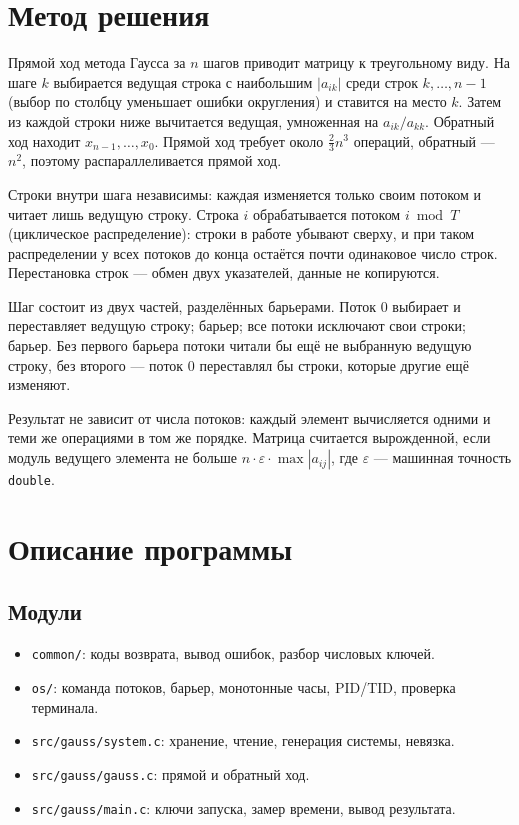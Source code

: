 \section{Метод решения}

Прямой ход метода Гаусса за $n$ шагов приводит матрицу к треугольному виду.
На шаге $k$ выбирается ведущая строка с наибольшим $|a_{ik}|$ среди строк
$k, \ldots, n-1$ (выбор по столбцу уменьшает ошибки округления) и ставится на
место $k$. Затем из каждой строки ниже вычитается ведущая, умноженная на
$a_{ik}/a_{kk}$. Обратный ход находит $x_{n-1}, \ldots, x_0$. Прямой ход требует
около $\frac{2}{3}n^3$ операций, обратный --- $n^2$, поэтому распараллеливается
прямой ход.

Строки внутри шага независимы: каждая изменяется только своим потоком и читает
лишь ведущую строку. Строка $i$ обрабатывается потоком $i \bmod T$
(циклическое распределение): строки в работе убывают сверху, и при таком
распределении у всех потоков до конца остаётся почти одинаковое число строк.
Перестановка строк --- обмен двух указателей, данные не копируются.

Шаг состоит из двух частей, разделённых барьерами. Поток 0 выбирает и
переставляет ведущую строку; барьер; все потоки исключают свои строки; барьер.
Без первого барьера потоки читали бы ещё не выбранную ведущую строку, без
второго --- поток 0 переставлял бы строки, которые другие ещё изменяют.

Результат не зависит от числа потоков: каждый элемент вычисляется одними и теми
же операциями в том же порядке. Матрица считается вырожденной, если модуль
ведущего элемента не больше $n \cdot \varepsilon \cdot \max|a_{ij}|$, где
$\varepsilon$ --- машинная точность \texttt{double}.

\section{Описание программы}

\subsection{Модули}
\begin{itemize}
\item \texttt{common/}: коды возврата, вывод ошибок, разбор числовых ключей.
\item \texttt{os/}: команда потоков, барьер, монотонные часы, PID/TID, проверка терминала.
\item \texttt{src/gauss/system.c}: хранение, чтение, генерация системы, невязка.
\item \texttt{src/gauss/gauss.c}: прямой и обратный ход.
\item \texttt{src/gauss/main.c}: ключи запуска, замер времени, вывод результата.
\end{itemize}

